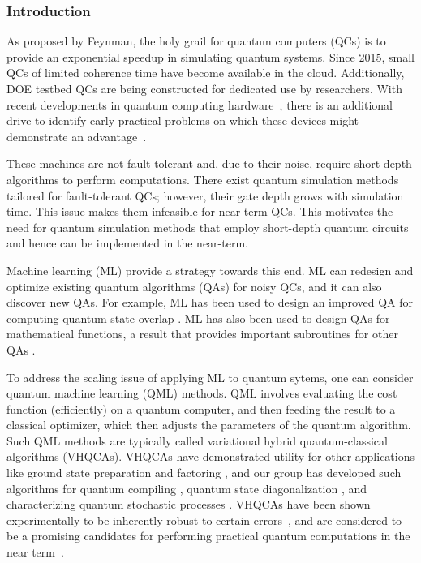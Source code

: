 \documentclass[10pt]{article}
\begin{document}
\subsubsection{ Introduction} As proposed by Feynman, the holy grail for quantum computers (QCs) is to provide an exponential speedup in simulating quantum systems. Since 2015, small QCs of limited coherence time have become available in the cloud. Additionally, DOE testbed QCs are being constructed for dedicated use by researchers. With recent developments in quantum computing
hardware~\cite{Corcoles2015,Riste2015,Kelly2015,Barends2016,Roushan2017}, there is an additional drive to identify early practical problems on which these devices might demonstrate an advantage~\cite{Mohseni2017,Boixo2016}.


These machines are not fault-tolerant and, due to their noise, require short-depth algorithms to perform computations. There exist quantum simulation methods \cite{6-8} tailored for fault-tolerant QCs; however, their gate depth grows with simulation time. This issue makes them infeasible for near-term QCs. This motivates the need for quantum simulation methods that employ short-depth quantum circuits and hence can be implemented in the near-term. 

Machine learning (ML) provide a strategy towards this end. ML can redesign and optimize existing quantum algorithms (QAs) for noisy QCs, and it can also discover new QAs. For example, ML has been used to design an improved QA for computing quantum state overlap \cite{Cincio2018}. ML has also been used to design QAs for mathematical functions, a result that provides important subroutines for other QAs \cite{Mitarai2018}. 

To address the scaling issue of applying ML to quantum sytems, one can consider quantum machine learning (QML) methods. QML involves evaluating the cost function (efficiently) on a quantum computer, and then feeding the result to a classical optimizer, which then adjusts the parameters of the quantum algorithm. Such QML methods are typically called variational hybrid quantum-classical algorithms (VHQCAs). VHQCAs have demonstrated utility for other applications like ground state preparation \cite{Peruzzo2013,McClean2015} and factoring \cite{?}, and our group has developed such algorithms for quantum compiling \cite{Khatri2018}, quantum state diagonalization \cite{LaRose2018}, and characterizing quantum stochastic processes \cite{?}. VHQCAs have been shown experimentally to be inherently robust to certain errors~\cite{OMalley2016}, and are considered to be a promising candidates for performing practical
quantum computations in the near term~\cite{Wecker2015a,Mueck2015}. 
\end{document}
